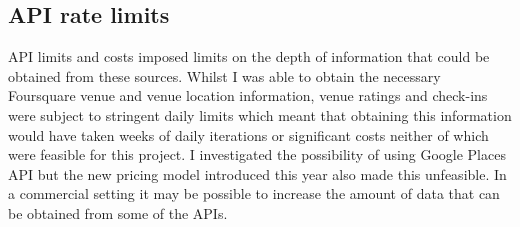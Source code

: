 \subsection{API rate limits}

API limits and costs imposed limits on the depth of information that could be obtained from these sources. Whilst I was able to obtain the necessary Foursquare venue and venue location information, venue ratings and check-ins were subject to stringent daily limits which meant that obtaining this information would have taken weeks of daily iterations or significant costs neither of which were feasible for this project. I investigated the possibility of using Google Places API but the new pricing model introduced this year also made this unfeasible. In a commercial setting it may be possible to increase the amount of data that can be obtained from some of the APIs.
